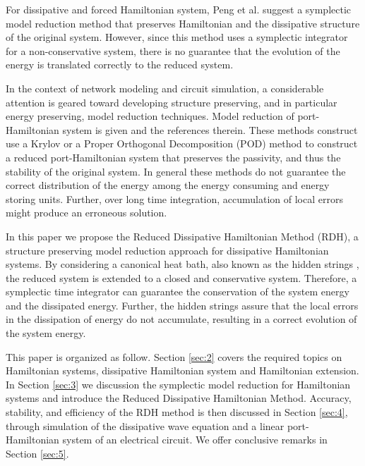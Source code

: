 For dissipative and forced Hamiltonian system, Peng et al. \cite{peng2016geometric} suggest a symplectic model reduction method that preserves Hamiltonian and the dissipative structure of the original system. However, since this method uses a symplectic integrator for a non-conservative system, there is no guarantee that the evolution of the energy is translated correctly to the reduced system.

In the context of network modeling and circuit simulation, a considerable attention is geared toward developing structure preserving, and in particular energy preserving, model reduction techniques. Model reduction of port-Hamiltonian system is given \cite{Polyuga:2010gj,beattie2011structure,chaturantabut2016structure} and the references therein. These methods construct use a Krylov or a Proper Orthogonal Decomposition (POD) method to construct a reduced port-Hamiltonian system that preserves the passivity, and thus the stability of the original system. In general these methods do not guarantee the correct distribution of the energy among the energy consuming and energy storing units. Further, over long time integration, accumulation of local errors might produce an erroneous solution.

In this paper we propose the Reduced Dissipative Hamiltonian Method (RDH), a structure preserving model reduction approach for dissipative Hamiltonian systems. By considering a canonical heat bath, also known as the hidden strings \cite{Figotin:2006jy,Figotin:2005}, the reduced system is extended to a closed and conservative system. Therefore, a symplectic time integrator can guarantee the conservation of the system energy and the dissipated energy. Further, the hidden strings assure that the local errors in the dissipation of energy do not accumulate, resulting in a correct evolution of the system energy.

This paper is organized as follow. Section \ref{sec:2} covers the required topics on Hamiltonian systems, dissipative Hamiltonian system and Hamiltonian extension. In Section \ref{sec:3} we discussion the symplectic model reduction for Hamiltonian systems and introduce the Reduced Dissipative Hamiltonian Method. Accuracy, stability, and efficiency of the RDH method is then discussed in Section \ref{sec:4}, through simulation of the dissipative wave equation and a linear port-Hamiltonian system of an electrical circuit. We offer conclusive remarks in Section \ref{sec:5}.
